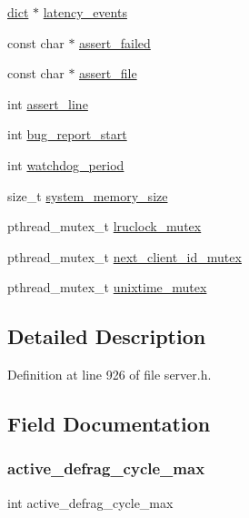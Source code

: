 \begin{DoxyCompactItemize}
\item 
\hyperlink{structdict}{dict} $\ast$ \hyperlink{structredis_server_a821e7827b8f03e754976119886d929bd}{latency\+\_\+events}
\item 
const char $\ast$ \hyperlink{structredis_server_a7efbc19379f272f8ce13f1eb663a0fdb}{assert\+\_\+failed}
\item 
const char $\ast$ \hyperlink{structredis_server_a88cc72814affa99c142827f25b714fd9}{assert\+\_\+file}
\item 
int \hyperlink{structredis_server_ae0f9ff421f7264992c5857ea7f03fb50}{assert\+\_\+line}
\item 
int \hyperlink{structredis_server_ae14e3c2d101f572b27b06e1f23613000}{bug\+\_\+report\+\_\+start}
\item 
int \hyperlink{structredis_server_a6b2bc45f4e219cd3c7f1dbc717ad88ea}{watchdog\+\_\+period}
\item 
size\+\_\+t \hyperlink{structredis_server_a6ee3dc3ba57fc269a2becfe29fdc8d42}{system\+\_\+memory\+\_\+size}
\item 
pthread\+\_\+mutex\+\_\+t \hyperlink{structredis_server_abbd87a8d07dfa99cfb535b59fcb83b4c}{lruclock\+\_\+mutex}
\item 
pthread\+\_\+mutex\+\_\+t \hyperlink{structredis_server_ab3c25439f27c5b8411020804ffe59b51}{next\+\_\+client\+\_\+id\+\_\+mutex}
\item 
pthread\+\_\+mutex\+\_\+t \hyperlink{structredis_server_a25c0d5c7a909d3768192bd96a83116fc}{unixtime\+\_\+mutex}
\end{DoxyCompactItemize}


\subsection{Detailed Description}


Definition at line 926 of file server.\+h.



\subsection{Field Documentation}
\mbox{\label{structredis_server_abb5ed4e0e888f5378c38ea3667cec956}} 
\subsubsection{\texorpdfstring{active\+\_\+defrag\+\_\+cycle\+\_\+max}{active\_defrag\_cycle\_max}}
{\footnotesize\ttfamily int active\+\_\+defrag\+\_\+cycle\+\_\+max}



